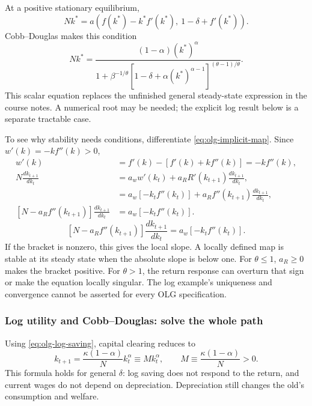 At a positive stationary equilibrium,
\begin{equation}\label{eq:olg-general-steady}
Nk^*=a\!\left(f(k^*)-k^*f'(k^*),\ 1-\delta+f'(k^*)\right).
\end{equation}
Cobb--Douglas makes this condition
\begin{equation}
Nk^*=
\frac{(1-\alpha)(k^*)^\alpha}
{1+\beta^{-1/\theta}[1-\delta+\alpha(k^*)^{\alpha-1}]^{(\theta-1)/\theta}}.
\end{equation}
This scalar equation replaces the unfinished general steady-state expression
in the course notes. A numerical root may be needed; the explicit log result
below is a separate tractable case.

To see why stability needs conditions, differentiate
\eqref{eq:olg-implicit-map}. Since $w'(k)=-kf''(k)>0$,
\begin{align}
w'(k)&=f'(k)-[f'(k)+kf''(k)]=-kf''(k),\\
N\frac{dk_{t+1}}{dk_t}
 &=a_w w'(k_t)+a_R R'(k_{t+1})\frac{dk_{t+1}}{dk_t},\\
 &=a_w[-k_tf''(k_t)]
    +a_R f''(k_{t+1})\frac{dk_{t+1}}{dk_t},\\
\left[N-a_Rf''(k_{t+1})\right]\frac{dk_{t+1}}{dk_t}
 &=a_w[-k_tf''(k_t)].
\end{align}
\begin{equation}\label{eq:olg-map-slope}
\left[N-a_R f''(k_{t+1})\right]\frac{dk_{t+1}}{dk_t}
=a_w[-k_tf''(k_t)].
\end{equation}
If the bracket is nonzero, this gives the local slope. A locally defined map
is stable at its steady state when the absolute slope is below one.
For $\theta\leq1$, $a_R\geq0$ makes the bracket positive. For $\theta>1$,
the return response can overturn that sign or make the equation locally
singular. The log example's uniqueness and convergence cannot be asserted
for every OLG specification.

\subsubsection{Log utility and Cobb--Douglas: solve the whole path}

Using \eqref{eq:olg-log-saving}, capital clearing reduces to
\begin{equation}\label{eq:olg-log-map}
k_{t+1}=\frac{\kappa(1-\alpha)}{N}k_t^\alpha
\equiv M k_t^\alpha,
\qquad M\equiv\frac{\kappa(1-\alpha)}{N}>0.
\end{equation}
This formula holds for general $\delta$: log saving does not respond to the
return, and current wages do not depend on depreciation. Depreciation still
changes the old's consumption and welfare.


